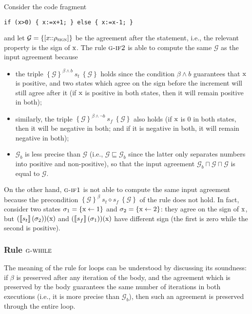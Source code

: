 \documentclass[prodmode,acmtocl]{acmsmall}
\def\state{\ensuremath{\sigma}\xspace}
\def\uco{\ensuremath{\rho}\xspace}
\newcommand{\la}{\leftarrow}
\newcommand{\0}{\mbox{\bf 0}}
\newcommand{\CODE}[1]{\ensuremath{\mbox{\lstinline!#1!}\xspace}\xspace}
\def\xx{\CODE{x}}
\newcommand{\SEMANTICS}[1]{\left\llbracket #1 \right\rrbracket}
\def\SIGNDOM{\ensuremath{\uco_{\textsc{sign}}}\xspace}
\def\PRED{\beta}
\def\AGREEM{\mathcal{G}}
\newcommand{\AGRS}[2]{[#2{::}#1]}
\newcommand{\GRULENAME}[1]{\textsc{g-#1}}
\newcommand{\TRIPLEB}[4]{\left\{#1\right\}^{#2}\ #3\ \left\{#4\right\}}
\begin{document}
\begin{example}
  \label{ex:ifRules}
  Consider the code fragment

  \vspace{-5mm}

  \begin{lstlisting}[numbers=none]
   if (x>0) { x:=x+1; } else { x:=x-1; }
  \end{lstlisting}
  and let $\AGREEM = \{ \AGRS{\SIGNDOM}{x} \}$ be the agreement after
  the statement, i.e., the relevant property is the sign of \xx.  The
  rule $\GRULENAME{if2}$ is able to compute the same $\AGREEM$ as the
  input agreement because
  \begin{itemize}
  \item the triple $\TRIPLEB{\AGREEM} {\PRED\wedge b} {s_t} {\AGREEM}$
    holds since the condition $\PRED\wedge b$ guarantees that \xx is
    positive, and two states which agree on the sign before the
    increment will still agree after it (if \xx is positive in both
    states, then it will remain positive in both);
  \item similarly, the triple $\TRIPLEB{\AGREEM} {\PRED\wedge \lnot b}
    {s_f} {\AGREEM}$ also holds (if \xx is 0 in both states, then it
    will be negative in both; and if it is negative in both, it will
    remain negative in both);
  \item $\AGREEM_b$ is less precise than $\AGREEM$ (i.e., $\AGREEM
    \sqsubseteq \AGREEM_b$ since the latter only separates numbers
    into positive and non-positive), so that the input agreement
    $\AGREEM_b \sqcap \AGREEM \sqcap \AGREEM$ is equal to $\AGREEM$.
  \end{itemize}
  On the other hand, $\GRULENAME{if1}$ is not able to compute the same
  input agreement because the precondition
  $\TRIPLEB{\AGREEM}{\PRED}{s_t \diamond s_f}{\AGREEM}$ of the rule
  does not hold.  In fact, consider two states $\state_1 = \{
  \mbox{\xx} \la 1 \}$ and $\state_2 = \{ \mbox{\xx} \la 2 \}$: they
  agree on the sign of \xx, but
  $(\SEMANTICS{s_t}(\state_2))(\mbox{\xx})$ and
  $(\SEMANTICS{s_f}(\state_1))(\mbox{\xx})$ have different sign (the
  first is zero while the second is positive).
\end{example}

\subsubsection{Rule $\GRULENAME{while}$}

The meaning of the rule for loops can be understood by discussing its
soundness: if $\PRED$ is preserved after any iteration of the body,
and the agreement which is preserved by the body guarantees the same
number of iterations in both executions (i.e., it is more precise than
$\AGREEM_b$), then such an agreement is preserved through the entire
loop.
\end{document}
